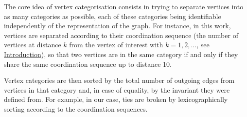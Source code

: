 \documentclass[main.tex]{subfiles}
\begin{document}
The core idea of vertex categorisation consists in trying to separate vertices into as many categories as possible, each of these categories being identifiable independently of the representation of the graph. For instance, in this work, vertices are separated according to their coordination sequence (the number of vertices at distance $k$ from the vertex of interest with $k=1,2,...$, see \hyperref[coordinationsequence]{Introduction}), so that two vertices are in the same category if and only if they share the same coordination sequence up to distance 10.%

Vertex categories are then sorted by the total number of outgoing edges from vertices in that category and, in case of equality, by the invariant they were defined from. For example, in our case, ties are broken by lexicographically sorting according to the coordination sequences.%

%
\end{document}
